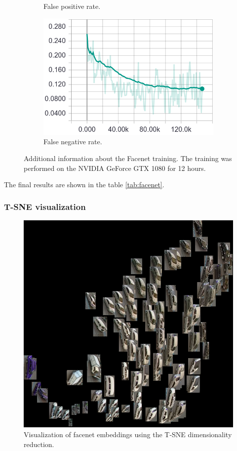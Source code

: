 \documentclass[a4paper,11pt,titlepage,twoside]{article}
\numberwithin{figure}{section}
\begin{document}
\begin{figure}[H]
\begin{subfigure}[Sample1]{0.5\linewidth}
        \caption{False positive rate.}   
        \label{fig:facenet}
    \end{subfigure}
    \begin{subfigure}[Sample1]{0.5\linewidth} 
    	\includegraphics[width=0.95\linewidth]{fig/facenet/fnr.png}
        \caption{False negative rate.}   
        \label{fig:facenet}
    \end{subfigure}       
    \caption{Additional information about the Facenet training. The training was performed on the NVIDIA GeForce GTX 1080 for 12 hours.}
    \label{fig:facenet_training_additional}
\end{figure}

The final results are shown in the table \ref{tab:facenet}.

\subsubsection{T-SNE visualization}
\begin{figure}[h!]
\centering
\includegraphics[width=0.5\linewidth]{fig/tsne0.png}
\caption{Visualization of facenet embeddings using the T-SNE dimensionality reduction.}
\label{fig:facenet_training}
\end{figure}
\end{document}
